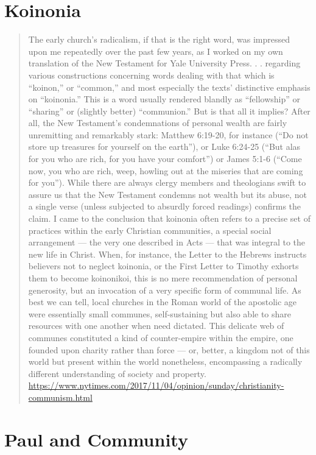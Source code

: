 \documentclass[11pt]{article}
\begin{document}
\section{Koinonia}
\begin{quote}
The early church’s radicalism, if that is the right word, was impressed upon me repeatedly over the past few years, as I worked on my own translation of the New Testament for Yale University Press. . .  regarding various constructions concerning words dealing with that which is “koinon,” or “common,” and most especially the texts’ distinctive emphasis on “koinonia.” This is a word usually rendered blandly as “fellowship” or “sharing” or (slightly better) “communion.” But is that all it implies?
After all, the New Testament’s condemnations of personal wealth are fairly unremitting and remarkably stark: Matthew 6:19-20, for instance (“Do not store up treasures for yourself on the earth”), or Luke 6:24-25 (“But alas for you who are rich, for you have your comfort”) or James 5:1-6 (“Come now, you who are rich, weep, howling out at the miseries that are coming for you”). While there are always clergy members and theologians swift to assure us that the New Testament condemns not wealth but its abuse, not a single verse (unless subjected to absurdly forced readings) confirms the claim.
I came to the conclusion that koinonia often refers to a precise set of practices within the early Christian communities, a special social arrangement — the very one described in Acts — that was integral to the new life in Christ. When, for instance, the Letter to the Hebrews instructs believers not to neglect koinonia, or the First Letter to Timothy exhorts them to become koinonikoi, this is no mere recommendation of personal generosity, but an invocation of a very specific form of communal life.
As best we can tell, local churches in the Roman world of the apostolic age were essentially small communes, self-sustaining but also able to share resources with one another when need dictated. This delicate web of communes constituted a kind of counter-empire within the empire, one founded upon charity rather than force — or, better, a kingdom not of this world but present within the world nonetheless, encompassing a radically different understanding of society and property.
\url{https://www.nytimes.com/2017/11/04/opinion/sunday/christianity-communism.html}
\end{quote}


\section{Paul and Community}
\end{document}
